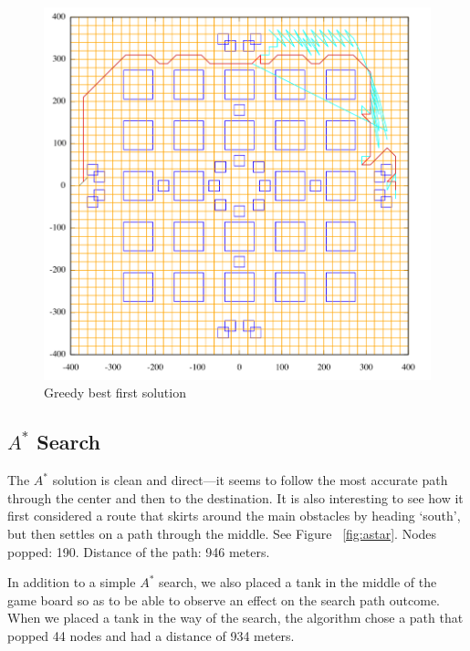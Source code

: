 \begin{figure}\label{fig:gbf}
\begin{center}\centering
\includegraphics[width=\textwidth]{gbf.png}
\caption{Greedy best first solution}
\end{center}
\end{figure}


\subsection{$A^*$ Search}
The $A^*$ solution is clean and direct---it seems to follow the most accurate path through the center and then to the destination.  It is also interesting to see how it first considered a route that skirts around the main obstacles by heading `south', but then settles on a path through the middle.  See Figure ~\ref{fig:astar}.  Nodes popped: 190.  Distance of the path: 946 meters.
\par
In addition to a simple $A^*$ search, we also placed a tank in the middle of the game board so as to be able to observe an effect on the search path outcome.  When we placed a tank in the way of the search, the algorithm chose a path that popped 44 nodes and had a distance of 934 meters.

